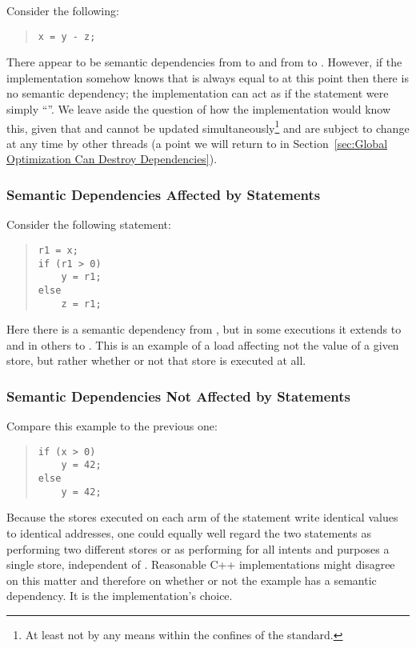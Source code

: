 Consider the following:
\begin{quote}
\begin{verbatim}
x = y - z;
\end{verbatim}
\end{quote}
There appear to be semantic dependencies from  to  and from 
to .
However, if the implementation somehow knows that  is
always equal to  at this point then there is no semantic dependency;
the implementation can act as if the statement were simply ``''.
We leave aside the question of how the implementation would know this,
given that  and  cannot be updated simultaneously\footnote{
	At least not by any means within the confines of the standard.}
and are subject to change at any time by
other threads (a point we will return to in
Section~\ref{sec:Global Optimization Can Destroy Dependencies}).

\subsubsection{Semantic Dependencies Affected by  Statements}
\label{sec:Semantic Dependencies Affected by if Statements}

Consider the following  statement:
\begin{quote}
\begin{verbatim}
r1 = x;
if (r1 > 0)
    y = r1;
else
    z = r1;
\end{verbatim}
\end{quote}
Here there is a semantic dependency from , but in some executions
it extends to  and in others to .
This is an example of a load affecting not the value of
a given store, but rather whether or not that store is executed at all.

\subsubsection{Semantic Dependencies Not Affected by  Statements}
\label{sec:Semantic Dependencies Not Affected by if Statements}

Compare this example to the previous one:
\begin{quote}
\begin{verbatim}
if (x > 0)
    y = 42;
else
    y = 42;
\end{verbatim}
\end{quote}
Because the stores executed on each arm of the  statement write
identical values to identical addresses, one could equally well regard
the two statements as performing two different stores or as performing
for all intents and purposes a single store, independent of .
Reasonable C++ implementations might disagree on this matter and
therefore on whether or not the example has a semantic dependency.
It is the implementation's choice.


